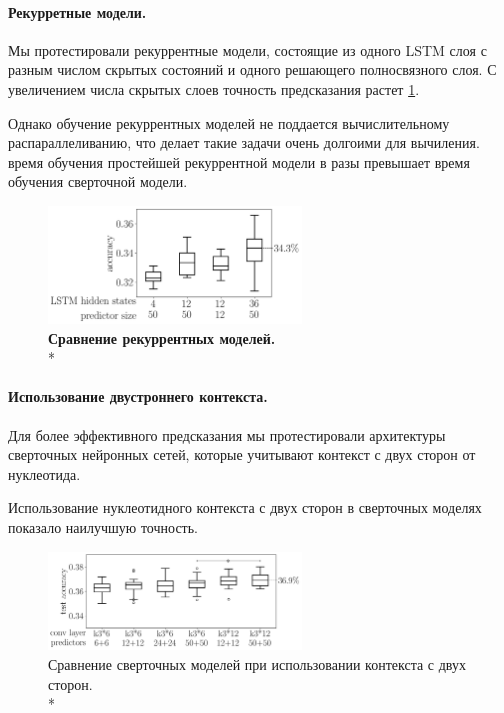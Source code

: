


\paragraph{Рекурретные модели.}
Мы протестировали рекуррентные модели, состоящие из одного LSTM слоя с разным числом скрытых состояний и одного решающего полносвязного слоя.
С увеличением числа скрытых слоев точность предсказания растет \ref{fig:rnn_test}.

Однако обучение рекуррентных моделей не поддается вычислительному распараллеливанию, что делает такие задачи очень долгоими для вычиления. время обучения простейшей рекуррентной модели в разы превышает время обучения сверточной модели.  

\begin{figure}[H] %
	\centering
	\includegraphics[width = 0.6\textwidth]{pics/rnn_models_all_runs_p1_ecoli_100000_10000_50_0.png}
	\caption{{\bfseries Сравнение рекуррентных моделей.} \\* 
		   \mannwhitni }
	\label{fig:rnn_test}	
\end{figure}

\paragraph{Использование двустроннего контекста.} Для более эффективного предсказания мы протестировали архитектуры сверточных нейронных сетей, которые учитывают контекст с двух сторон от нуклеотида. 

Использование нуклеотидного контекста с двух сторон в сверточных моделях показало наилучшую точность.

\begin{figure}[H] %
	\centering
	\includegraphics[width = 0.6\textwidth]{pics/cnn_models_two_sided.png}
	\caption{{\bfseries} Сравнение сверточных моделей при использовании контекста с двух сторон.\\* }
	\label{fig:cnn_twosided}	
\end{figure}
	